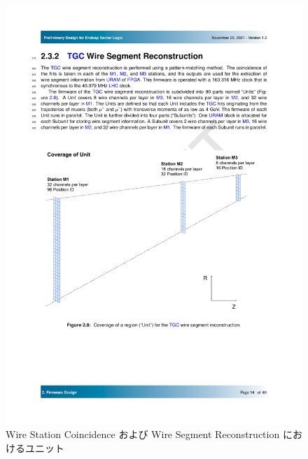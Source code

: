 \begin{figure} 
\centering
\includegraphics[width=16cm]{fig/SL/StationCoin_unit.pdf}
\caption[Wire Station Coincidence および Wire Segment Reconstruction におけるユニット]{Wire Station Coincidence および Wire Segment Reconstruction におけるユニット}
\label{StationCoin_unit}
\end{figure}

